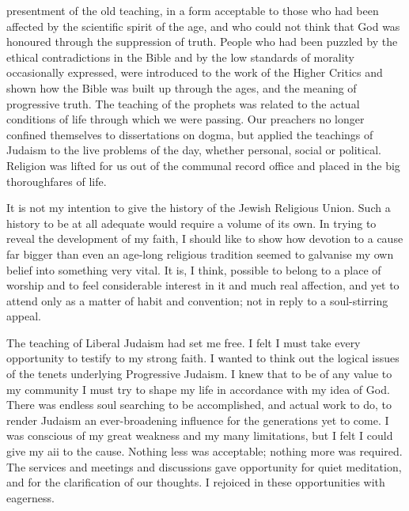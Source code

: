 presentment of the old teaching, in a form acceptable to
those who had been affected by the scientific spirit of the
age, and who could not think that God was honoured
through the suppression of truth. People who had been
puzzled by the ethical contradictions in the Bible and
by the low standards of morality occasionally expressed,
were introduced to the work of the Higher Critics and
shown how the Bible was built up through the ages, and
the meaning of progressive truth. The teaching of the
prophets was related to the actual conditions of life
through which we were passing. Our preachers no longer
confined themselves to dissertations on dogma, but
applied the teachings of Judaism to the live problems of
the day, whether personal, social or political. Religion
was lifted for us out of the communal record office and
placed in the big thoroughfares of life.

It is not my intention to give the history of the
Jewish Religious Union. Such a history to be at all
adequate would require a volume of its own. In trying
to reveal the development of my faith, I should like to show
how devotion to a cause far bigger than even an age-long
religious tradition seemed to galvanise my own belief
into something very vital. It is, I think, possible to
belong to a place of worship and to feel considerable
interest in it and much real affection, and yet to attend
only as a matter of habit and convention; not in reply
to a soul-stirring appeal.

The teaching of Liberal Judaism had set me free. I
felt I must take every opportunity to testify to my strong
faith. I wanted to think out the logical issues of the
tenets underlying Progressive Judaism. I knew that to
be of any value to my community I must try to shape
my life in accordance with my idea of God. There was
endless soul searching to be accomplished, and actual
work to do, to render Judaism an ever-broadening influence
for the generations yet to come. I was conscious of
my great weakness and my many limitations, but I felt
I could give my aii to the cause. Nothing less was
acceptable; nothing more was required. The services
and meetings and discussions gave opportunity for quiet
meditation, and for the clarification of our thoughts. I
rejoiced in these opportunities with eagerness.

